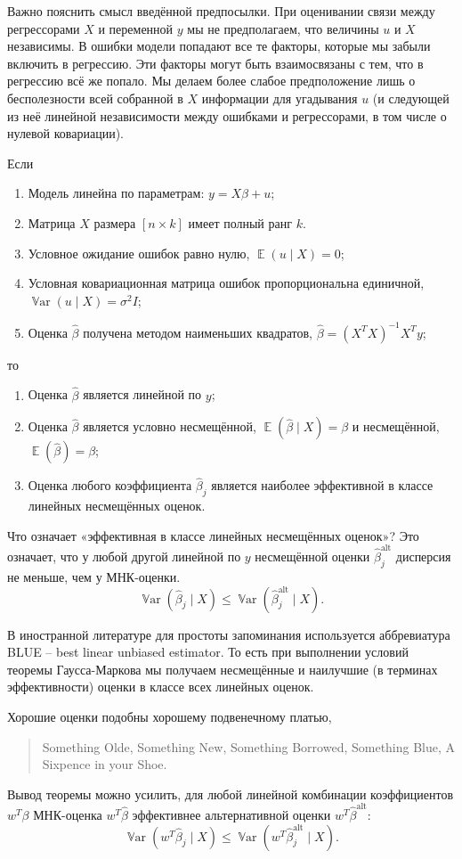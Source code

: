 \documentclass[12pt]{article}
\DeclareMathOperator{\Var}{\mathbb{V}ar}
\DeclareMathOperator{\E}{\mathbb{E}}
\renewcommand{\b}{\beta}
\newcommand{\hb}{\hat{\beta}}
\renewcommand{\u}{u}
\newcommand{\alt}{\text{alt}}
\newcommand{\gaussmarkov}{
\begin{enumerate}[label=\arabic*.]
    \item Модель линейна по параметрам: $y = X\b + u$;
    \item Матрица $X$ размера $[n \times k]$ имеет полный ранг $k$.
    \item Условное ожидание ошибок равно нулю, $\E(\u \mid X) = 0$;
    \item Условная ковариационная матрица ошибок пропорциональна единичной, $\Var(\u \mid X) = \sigma^2 I$;
    \item Оценка $\hb$ получена методом наименьших квадратов, $\hb = (X^T X)^{-1}X^T y$;
\end{enumerate}}
\begin{document}
Важно пояснить смысл введённой предпосылки. При оценивании связи между регрессорами $X$ и переменной $y$ мы не предполагаем, что величины $u$ и $X$ независимы. В ошибки модели попадают все те факторы, которые мы забыли включить в регрессию. Эти факторы могут быть взаимосвязаны с тем, что в регрессию всё же попало. Мы делаем более слабое предположение лишь о бесполезности всей собранной в $X$ информации для угадывания $u$ (и следующей из неё линейной независимости между ошибками и регрессорами, в том числе о нулевой ковариации).

\begin{theorem}
Если 
\gaussmarkov
то
\begin{enumerate}[label=(\alph*)]
    \item Оценка $\hb$ является линейной по $y$;
    \item Оценка $\hb$ является условно несмещённой, $\E(\hb \mid X) = \b$ и несмещённой, $\E(\hb) = \b$;
    \item Оценка любого коэффициента $\hb_j$ является наиболее эффективной в классе линейных несмещённых оценок. 
\end{enumerate}
\end{theorem}

Что означает «эффективная в классе линейных несмещённых оценок»?
Это означает, что у любой другой линейной по $y$ несмещённой оценки $\hb^{\alt}_j$ дисперсия не меньше, чем у МНК-оценки.
\[
\Var(\hb_j \mid X) \leq \Var(\hb^{\alt}_j \mid X).
\]



В иностранной литературе для простоты запоминания используется аббревиатура BLUE -- best linear unbiased estimator. То есть при выполнении условий теоремы Гаусса-Маркова мы получаем несмещённые и наилучшие (в терминах эффективности) оценки в классе всех линейных оценок.

Хорошие оценки подобны хорошему подвенечному платью,
\begin{quotation}
Something Olde, Something New, Something Borrowed, Something Blue, A Sixpence in your Shoe.    
\end{quotation}


Вывод теоремы можно усилить, для любой линейной комбинации коэффициентов $w^T \b$ МНК-оценка $w^T \hb$ эффективнее альтернативной оценки $w^T \hb^{\alt}$:
\[
\Var(w^T\hb_j \mid X) \leq \Var(w^T \hb^{\alt}_j \mid X).
\]
\end{document}
